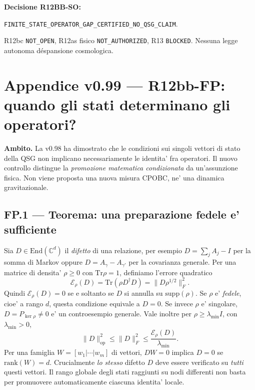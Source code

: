 \documentclass[11pt,a4paper]{article}
\begin{document}
\textbf{Decisione R12BB-SO:}\par\noindent
\texttt{FINITE\_STATE\_OPERATOR\_GAP\_CERTIFIED\_NO\_QSG\_CLAIM}.\par\noindent
R12bc \texttt{NOT\_OPEN}, R12as fisico \texttt{NOT\_AUTHORIZED}, R13 \texttt{BLOCKED}. Nessuna legge autonoma d\'espansione cosmologica.\par
\endgroup

\clearpage
\begingroup
\setlength{\parskip}{0.13em}
\section*{Appendice v0.99 --- R12bb-FP: quando gli stati determinano gli operatori?}
\textbf{Ambito.} La v0.98 ha dimostrato che le condizioni sui singoli vettori di stato della QSG non implicano necessariamente le identita' fra operatori. Il nuovo controllo distingue la \emph{promozione matematica condizionata} da un'assunzione fisica. Non viene proposta una nuova misura CPOBC, ne' una dinamica gravitazionale.

\subsection*{FP.1 --- Teorema: una preparazione fedele e' sufficiente}
Sia $D\in\mathrm{End}(\mathbb C^d)$ il \emph{difetto} di una relazione, per esempio $D=\sum_j A_j-I$ per la somma di Markov oppure $D=A_\gamma-A_{\gamma'}$ per la covarianza generale. Per una matrice di densita' $\rho\ge0$ con $\mathrm{Tr}\rho=1$, definiamo l'errore quadratico
\begin{equation}
\mathcal E_\rho(D)=\mathrm{Tr}(\rho D^\dagger D)
=\|D\rho^{1/2}\|_F^2.\tag{FP.1}
\end{equation}
Quindi $\mathcal E_\rho(D)=0$ se e soltanto se $D$ si annulla su $\mathrm{supp}(\rho)$. Se $\rho$ e' \emph{fedele}, cioe' a rango $d$, questa condizione equivale a $D=0$. Se invece $\rho$ e' singolare, $D=P_{\ker\rho}\ne0$ e' un controesempio generale. Vale inoltre per $\rho\ge\lambda_{\min}I$, con $\lambda_{\min}>0$,
\begin{equation}
\boxed{\ \|D\|_{\mathrm{op}}^2\le\|D\|_F^2\le
\frac{\mathcal E_\rho(D)}{\lambda_{\min}}.\ }\tag{FP.2}
\end{equation}
Per una famiglia $W=[w_1|\cdots|w_m]$ di vettori, $DW=0$ implica $D=0$ se $\mathrm{rank}(W)=d$. Crucialmente \emph{lo stesso} difetto $D$ deve essere verificato su \emph{tutti} questi vettori. Il rango globale degli stati raggiunti su nodi differenti non basta per promuovere automaticamente ciascuna identita' locale.
\end{document}
